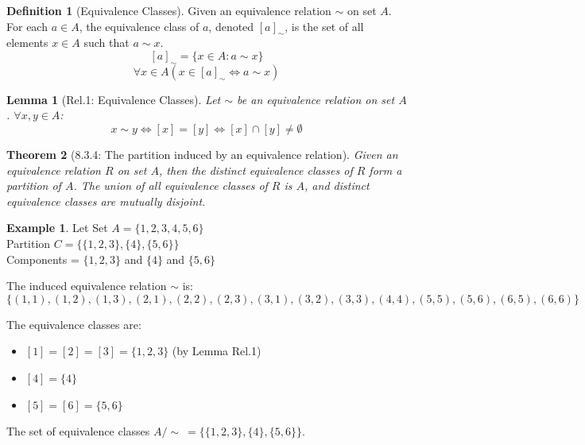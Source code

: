 \documentclass{article}
\theoremstyle{plain}
\newtheorem{theorem}{Theorem}[section]
\newtheorem{lemma}[theorem]{Lemma}
\theoremstyle{definition}
\newtheorem*{definition}{Definition}
\newtheorem*{example}{Example}
\theoremstyle{remark}
\begin{document}
\begin{definition}[Equivalence Classes]
    Given an equivalence relation $\sim$ on set $A$. For each $a \in A$, the equivalence class of $a$, denoted $[a]_\sim$, is the set of all elements $x \in A$ such that $a \sim x$.
    \[ [a]_\sim = \{x \in A : a \sim x\} \]
    \[ \forall x \in A (x \in [a]_\sim \Leftrightarrow a \sim x) \]
\end{definition}

\begin{lemma}[Rel.1: Equivalence Classes]
    Let $\sim$ be an equivalence relation on set $A$. $\forall x,y \in A$:
    \[ x \sim y \Leftrightarrow [x] = [y] \Leftrightarrow [x] \cap [y] \neq \emptyset \]
\end{lemma}

\begin{theorem}[8.3.4: The partition induced by an equivalence relation]
    Given an equivalence relation $R$ on set $A$, then the distinct equivalence classes of $R$ form a partition of $A$. The union of all equivalence classes of $R$ is $A$, and distinct equivalence classes are mutually disjoint.
\end{theorem}

\begin{example}
    Let Set $A = \{1,2,3,4,5,6\}$ \\
    Partition $C = \{\{1,2,3\}, \{4\}, \{5,6\}\}$ \\
    Components = $\{1,2,3\}$ and $\{4\}$ and $\{5,6\}$
    
    The induced equivalence relation $\sim$ is: 
    \[ \{(1,1), (1,2), (1,3), (2,1), (2,2), (2,3), (3,1), (3,2), (3,3), (4,4), (5,5), (5,6), (6,5), (6,6)\} \]
    
    The equivalence classes are:
    \begin{itemize}
        \item $[1] = [2] = [3] = \{1,2,3\}$ (by Lemma Rel.1)
        \item $[4] = \{4\}$
        \item $[5] = [6] = \{5,6\}$
    \end{itemize}
    
    The set of equivalence classes $A/\sim \ = \{\{1,2,3\}, \{4\}, \{5,6\}\}$.
\end{example}
\end{document}
